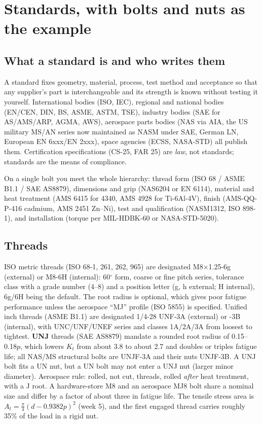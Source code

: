 \documentclass[11pt,a4paper]{article}
\begin{document}
\section{Standards, with bolts and nuts as the example}

\subsection{What a standard is and who writes them}
A standard fixes geometry, material, process, test method and acceptance so that any supplier's part is interchangeable and its strength is known without testing it yourself. International bodies (ISO, IEC), regional and national bodies (EN/CEN, DIN, BS, ASME, ASTM, TSE), industry bodies (SAE for AS/AMS/ARP, AGMA, AWS), aerospace parts bodies (NAS via AIA, the US military MS/AN series now maintained as NASM under SAE, German LN, European EN 6xxx/EN 2xxx), space agencies (ECSS, NASA-STD) all publish them. Certification specifications (CS-25, FAR 25) are \emph{law}, not standards; standards are the means of compliance.

On a single bolt you meet the whole hierarchy: thread form (ISO 68 / ASME B1.1 / SAE AS8879), dimensions and grip (NAS6204 or EN 6114), material and heat treatment (AMS 6415 for 4340, AMS 4928 for Ti-6Al-4V), finish (AMS-QQ-P-416 cadmium, AMS 2451 Zn--Ni), test and qualification (NASM1312, ISO 898-1), and installation (torque per MIL-HDBK-60 or NASA-STD-5020).

\subsection{Threads}
ISO metric threads (ISO 68-1, 261, 262, 965) are designated M8$\times$1.25-6g (external) or M8-6H (internal): 60$^\circ$ form, coarse or fine pitch series, tolerance class with a grade number (4--8) and a position letter (g, h external; H internal), 6g/6H being the default. The root radius is optional, which gives poor fatigue performance unless the aerospace ``MJ'' profile (ISO 5855) is specified. Unified inch threads (ASME B1.1) are designated 1/4-28 UNF-3A (external) or -3B (internal), with UNC/UNF/UNEF series and classes 1A/2A/3A from loosest to tightest. \textbf{UNJ} threads (SAE AS8879) mandate a rounded root radius of 0.15--0.18$p$, which lowers $K_t$ from about 3.8 to about 2.7 and doubles or triples fatigue life; all NAS/MS structural bolts are UNJF-3A and their nuts UNJF-3B. A UNJ bolt fits a UN nut, but a UN bolt may not enter a UNJ nut (larger minor diameter). Aerospace rule: rolled, not cut, threads, rolled \emph{after} heat treatment, with a J root. A hardware-store M8 and an aerospace MJ8 bolt share a nominal size and differ by a factor of about three in fatigue life. The tensile stress area is $A_t=\frac{\pi}{4}(d-0.9382p)^2$ (week 5), and the first engaged thread carries roughly 35\% of the load in a rigid nut.
\end{document}
